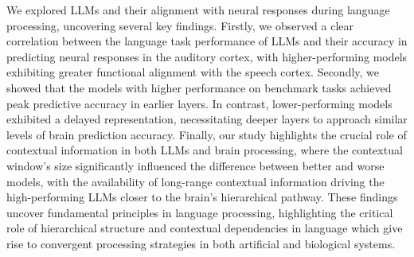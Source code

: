 
We explored LLMs and their alignment with neural responses during language processing, uncovering several key findings. Firstly, we observed a clear correlation between the language task performance of LLMs and their accuracy in predicting neural responses in the auditory cortex, with higher-performing models exhibiting greater functional alignment with the speech cortex. Secondly, we showed that the models with higher performance on benchmark tasks achieved peak predictive accuracy in earlier layers. In contrast, lower-performing models exhibited a delayed representation, necessitating deeper layers to approach similar levels of brain prediction accuracy. Finally, our study highlights the crucial role of contextual information in both LLMs and brain processing, where the contextual window's size significantly influenced the difference between better and worse models, with the availability of long-range contextual information driving the high-performing LLMs closer to the brain's hierarchical pathway. These findings uncover fundamental principles in language processing, highlighting the critical role of hierarchical structure and contextual dependencies in language which give rise to convergent processing strategies in both artificial and biological systems. 

